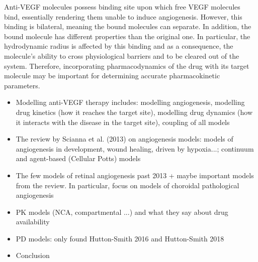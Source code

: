 \documentclass[12pt,a4paper]{article}
\begin{document}
Anti-VEGF molecules possess binding site upon which free VEGF molecules bind, essentially rendering them unable to induce angiogenesis.
However, this binding is bilateral, meaning the bound molecules can separate.
In addition, the bound molecule has different properties than the original one.
In particular, the hydrodynamic radius is affected by this binding and as a consequence, the molecule's ability to cross physiological barriers and to be cleared out of the system.
Therefore, incorporating pharmacodynamics of the drug with its target molecule may be important for determining accurate pharmacokinetic parameters.

\newpage

\begin{itemize}
\item Modelling anti-VEGF therapy includes: modelling angiogenesis, modelling drug kinetics (how it reaches the target site), modelling drug dynamics (how it interacts with the disease in the target site), coupling of all models
\item The review by Scianna et al. (2013) on angiogenesis models: models of angiogenesis in development, wound healing, driven by hypoxia...; continuum and agent-based (Cellular Potts) models
\item The few models of retinal angiogenesis past 2013 + maybe important models from the review. In particular, focus on models of choroidal pathological angiogenesis 
\item PK models (NCA, compartmental ...) and what they say about drug availability
\item PD models: only found Hutton-Smith 2016 and Hutton-Smith 2018
\item Conclusion
\end{itemize}


{\normalsize }
\end{document}
